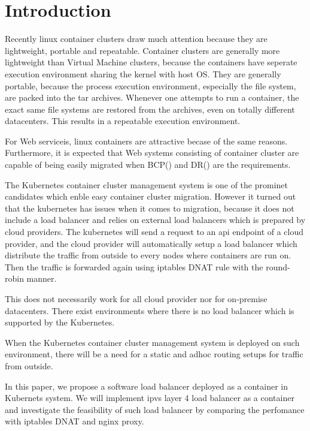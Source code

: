 \section{Introduction}

Recently linux container clusters draw much attention because they are lightweight, portable and repeatable.
Container clusters are generally more lightweight than Virtual Machine clusters, 
because the containers have seperate execution environment sharing the kernel with host OS. 
They are generally portable, because the process execution environment, especially the file system, are packed
into the tar archives.
Whenever one attempts to run a container, the exact same file systems are restored from the archives, 
even on totally different datacenters. 
This results in a repeatable execution environment.

For Web serviceis, linux containers are attractive becase of the same reasons. 
Furthermore, it is expected that Web systems consisting of container cluster are capable of being easily migrated 
when BCP() and DR() are the requirements. 

The Kubernetes\cite{K8s2017} container cluster management system is one of the prominet candidates
which enble easy container cluster migration.
However it turned out that the kubernetes has issues when it comes to migration, 
because it does not include a load balancer and relies on external load balancers  
which is prepared by cloud providers.
The kubernetes will send a request to an api endpoint of a cloud provider, 
and the cloud provider will automatically setup a load balancer which distribute the traffic from outside to every nodes
 where containers are run on. Then the traffic is forwarded again using iptables DNAT\cite{MartinA.Brown2017,Marmol2015} rule with the round-robin manner. 

This does not necessarily work for all cloud provider nor for on-premise datacenters.
There exist environments
where there is no load balancer which is supported by the Kubernetes.

When the Kubernetes container cluster management system is deployed on such environment,
there will be a need for a static and adhoc routing setups for traffic from outside.

In this paper, we propose a software load balancer deployed as a container in Kubernets system. 
We will implement ipvs\cite{Zhang2000} layer 4 load balancer as a container and 
investigate the feasibility of such load balancer by comparing the perfomance with iptables DNAT and nginx proxy.

